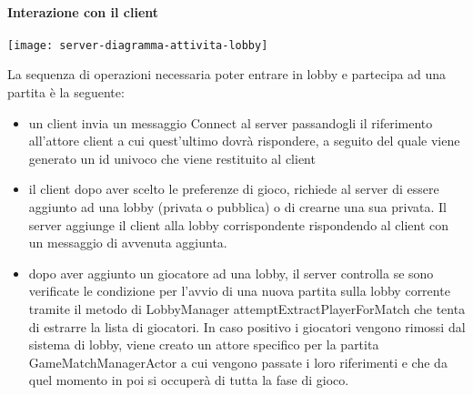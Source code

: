 \paragraph{Interazione con il client}
\begin{center}
    \texttt{[image: server-diagramma-attivita-lobby]}
\end{center}
La sequenza di operazioni necessaria poter entrare in lobby e partecipa ad una partita è la seguente:
\begin{itemize}
    \item un client invia un messaggio Connect al server passandogli il riferimento all’attore client a cui quest’ultimo dovrà rispondere, a seguito del quale viene generato un id univoco che viene restituito al client
    \item il client dopo aver scelto le preferenze di gioco, richiede al server di essere aggiunto ad una lobby (privata o pubblica) o di crearne una sua privata.
    Il server aggiunge il client alla lobby corrispondente rispondendo al client con un messaggio di avvenuta aggiunta.
    \item dopo aver aggiunto un giocatore ad una lobby, il server controlla se sono verificate le condizione per l’avvio di una nuova partita sulla lobby corrente tramite il metodo di LobbyManager attemptExtractPlayerForMatch che tenta di estrarre la lista di giocatori.
    In caso positivo i giocatori vengono rimossi dal sistema di lobby, viene creato un attore specifico per la partita GameMatchManagerActor a cui vengono passate i loro riferimenti e che da quel momento in poi si occuperà di tutta la fase di gioco.
\end{itemize}

